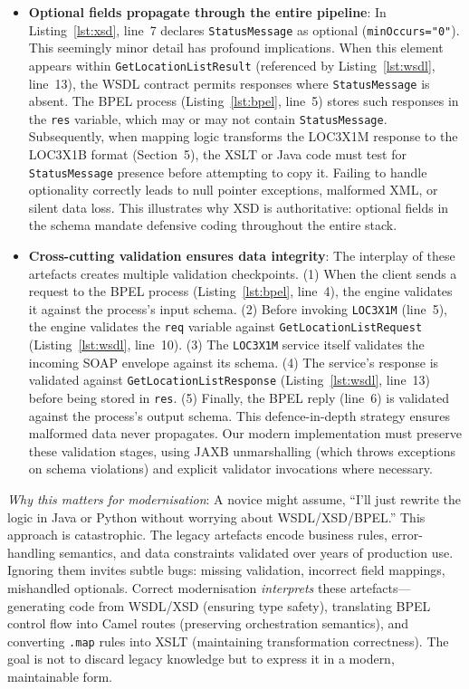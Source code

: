 \documentclass[11pt]{article}
\begin{document}
\begin{itemize}
  \item \textbf{Optional fields propagate through the entire pipeline}: In Listing~\ref{lst:xsd}, line~7 declares \texttt{StatusMessage} as optional (\texttt{minOccurs="0"}). This seemingly minor detail has profound implications. When this element appears within \texttt{GetLocationListResult} (referenced by Listing~\ref{lst:wsdl}, line~13), the WSDL contract permits responses where \texttt{StatusMessage} is absent. The BPEL process (Listing~\ref{lst:bpel}, line~5) stores such responses in the \texttt{res} variable, which may or may not contain \texttt{StatusMessage}. Subsequently, when mapping logic transforms the LOC3X1M response to the LOC3X1B format (Section~5), the XSLT or Java code must test for \texttt{StatusMessage} presence before attempting to copy it. Failing to handle optionality correctly leads to null pointer exceptions, malformed XML, or silent data loss. This illustrates why XSD is authoritative: optional fields in the schema mandate defensive coding throughout the entire stack.

  \item \textbf{Cross-cutting validation ensures data integrity}: The interplay of these artefacts creates multiple validation checkpoints. (1) When the client sends a request to the BPEL process (Listing~\ref{lst:bpel}, line~4), the engine validates it against the process's input schema. (2) Before invoking \texttt{LOC3X1M} (line~5), the engine validates the \texttt{req} variable against \texttt{GetLocationListRequest} (Listing~\ref{lst:wsdl}, line~10). (3) The \texttt{LOC3X1M} service itself validates the incoming SOAP envelope against its schema. (4) The service's response is validated against \texttt{GetLocationListResponse} (Listing~\ref{lst:wsdl}, line~13) before being stored in \texttt{res}. (5) Finally, the BPEL reply (line~6) is validated against the process's output schema. This defence-in-depth strategy ensures malformed data never propagates. Our modern implementation must preserve these validation stages, using JAXB unmarshalling (which throws exceptions on schema violations) and explicit validator invocations where necessary.
\end{itemize}

\noindent\emph{Why this matters for modernisation}: A novice might assume, ``I'll just rewrite the logic in Java or Python without worrying about WSDL/XSD/BPEL.'' This approach is catastrophic. The legacy artefacts encode business rules, error-handling semantics, and data constraints validated over years of production use. Ignoring them invites subtle bugs: missing validation, incorrect field mappings, mishandled optionals. Correct modernisation \emph{interprets} these artefacts—generating code from WSDL/XSD (ensuring type safety), translating BPEL control flow into Camel routes (preserving orchestration semantics), and converting \texttt{.map} rules into XSLT (maintaining transformation correctness). The goal is not to discard legacy knowledge but to express it in a modern, maintainable form.
\end{document}

